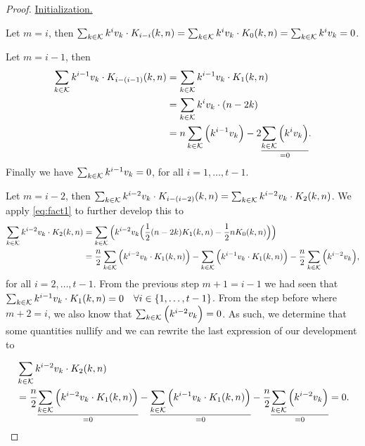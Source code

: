 \begin{proof}
    \underline{Initialization.}

    Let $m = i$, then $\sum_{k \in \mathcal{K}} k^iv_k \cdot K_{i - i}(k, n) = \sum_{k \in \mathcal{K}} k^iv_k \cdot K_{0}(k, n) = \sum_{k \in \mathcal{K}} k^iv_k = 0$.

    Let $m = i - 1$, then
    \begin{equation*}
        \begin{split}
            \sum_{k \in \mathcal{K}} k^{i-1}v_k \cdot K_{i - (i-1)}(k, n) &= \sum_{k \in \mathcal{K}} k^{i-1}v_k \cdot K_{1}(k, n)\\ &= \sum_{k \in \mathcal{K}} k^iv_k \cdot (n - 2k)\\ &= n\sum_{k \in \mathcal{K}} \Big( k^{i-1}v_k \Big) - 2\underset{=0}{\underline{\sum_{k \in \mathcal{K}} \Big( k^iv_k \Big)}}.
        \end{split}
    \end{equation*}
    Finally we have $\sum_{k \in \mathcal{K}} k^{i-1}v_k = 0$, for all $i = 1, \ldots, t-1$.

    Let $m = i - 2$, then $\sum_{k \in \mathcal{K}} k^{i-2}v_k \cdot K_{i - (i-2)}(k, n) = \sum_{k \in \mathcal{K}} k^{i-2}v_k \cdot K_{2}(k, n)$. We apply \cref{eq:fact1} to further develop this to
    \begin{equation*}
        \begin{split}
            \sum_{k \in \mathcal{K}} k^{i-2}v_k \cdot K_{2}(k, n) &= \sum_{k \in \mathcal{K}} \Big( k^{i-2}v_k \Big( \frac{1}{2}(n - 2k)K_1(k, n) - \frac{1}{2}nK_0(k, n) \Big)\Big)\\
            &= \frac{n}{2}\sum_{k \in \mathcal{K}} \Big( k^{i-2}v_k \cdot K_1(k, n) \Big) - \sum_{k \in \mathcal{K}} \Big( k^{i-1}v_k \cdot K_1(k,n) \Big) - \frac{n}{2}\sum_{k \in \mathcal{K}} \Big( k^{i-2}v_k \Big),
        \end{split}
    \end{equation*}
    for all $i = 2, \ldots, t-1$.
    From the previous step $m + 1 = i - 1$ we had seen that $\sum_{k \in \mathcal{K}} k^{i-1}v_k \cdot K_1(k, n) = 0\quad \forall i\in \{1, \ldots, t-1\}$. From the step before where $m + 2 = i$, we also know that $\sum_{k \in \mathcal{K}} \Big( k^{i-2}v_k \Big) = 0$. As such, we determine that some quantities nullify and we can rewrite the last expression of our development to

    \begin{equation*}
    \begin{split}
        &\sum_{k \in \mathcal{K}} k^{i-2}v_k \cdot K_{2}(k, n)\\
        &= \frac{n}{2}\underset{=0}{\underline{\sum_{k \in \mathcal{K}} \Big( k^{i-2}v_k \cdot K_1(k, n) \Big)}} - \underset{=0}{\underline{\sum_{k \in \mathcal{K}} \Big( k^{i-1}v_k \cdot K_1(k,n) \Big)}} - \frac{n}{2}\underset{=0}{\underline{\sum_{k \in \mathcal{K}} \Big( k^{i-2}v_k \Big)}} = 0.
    \end{split}
    \end{equation*}


\end{proof}
